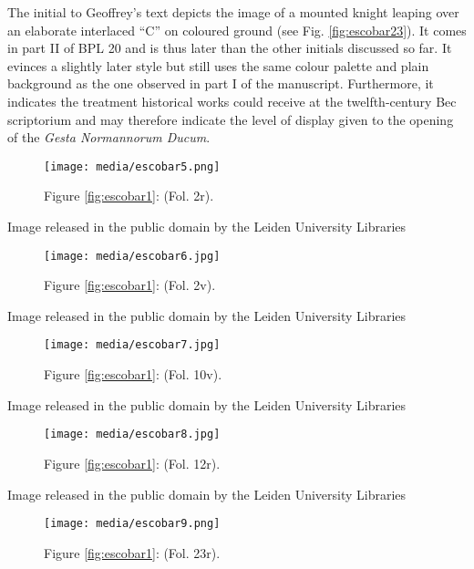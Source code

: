 \documentclass{article}
\begin{document}
The initial to Geoffrey's text depicts the image of a mounted knight
leaping over an elaborate interlaced ``C'' on coloured ground (see Fig.
\ref{fig:escobar23}). It comes in part II of BPL 20 and is thus later than the other
initials discussed so far. It evinces a slightly later style but still
uses the same colour palette and plain background as the one observed in
part I of the manuscript. Furthermore, it indicates the treatment
historical works could receive at the twelfth-century Bec scriptorium
and may therefore indicate the level of display given to the opening of
the \emph{Gesta Normannorum Ducum}.

\begin{figure}[H]
  \centering
    \texttt{[image: media/escobar5.png]}
    \caption{Figure \ref{fig:escobar1}: (Fol. 2r).}
    \label{fig:escobar5}
  \end{figure}

 Image released in the public domain by the Leiden University Libraries 


  \begin{figure}
    \texttt{[image: media/escobar6.jpg]}
    \caption{Figure \ref{fig:escobar1}: (Fol. 2v).}
    \label{fig:escobar6}
\end{figure}

 Image released in the public domain by the Leiden University Libraries 


\begin{figure}[H]
  \centering
  \texttt{[image: media/escobar7.jpg]}
    \caption{Figure \ref{fig:escobar1}: (Fol. 10v).}
    \label{fig:escobar7}
  \end{figure}

 Image released in the public domain by the Leiden University Libraries 


\begin{figure}[H]
  \centering
  \texttt{[image: media/escobar8.jpg]}
    \caption{Figure \ref{fig:escobar1}: (Fol. 12r).}
    \label{fig:escobar8}
  \end{figure}

 Image released in the public domain by the Leiden University Libraries 


\begin{figure}[H]
  \centering
    \texttt{[image: media/escobar9.png]}
    \caption{Figure \ref{fig:escobar1}: (Fol. 23r).}
    \label{fig:escobar9}
  \end{figure}
\end{document}

